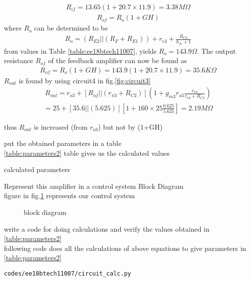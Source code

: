 \begin{enumerate}[label=\thesubsection.\arabic*.,ref=\thesubsection.\theenumi]
{\begin{align}
    R_{if}=13.65(1+20.7\times11.9)=3.38M\Omega
\end{align}
\begin{align}
    R_{of}=R_o(1+GH)
\end{align}
where $R_o$ can be determined to be 
 \begin{align}
    R_o=(R_{E2}||(R_F+R_{E1}))+r_{e3}+\frac{R_{C2}}{h_{fe}+1}
\end{align}
from values in Table \ref{table:ee18btech11007}, yields $R_o = 143.9 \Omega$. The output resistance $R_{of}$ of the feedback amplifier can now be found as
\begin{align}
    R_{of}=R_o(1+GH)=143.9(1+20.7\times11.9)=35.6K\Omega
\end{align}
$R_{out}$ is found by using circuit4 in fig.\ref{fig:circuit3}
\begin{align}
    R_{out}=r_{o3}+[R_{of}||(r_{\pi3}+R_{C2})](1+g_{m3}r_{o3}\frac{r_{\pi3}}{r_{\pi3}+R_{C2}})
\end{align}
\begin{align}
=25+[35.6||(5.625)][1+160\times25\frac{0.625}{5.625}]=2.19M\Omega \end{align}

thus $R_{out}$ is increased (from $r_{o3}$) but not by (1+GH)
\item put the obtained parameters in a table
\\
\solution \ref{table:parameters2} table gives us the calculated values
\begin{table}[!ht]
\centering

\caption{calculated parameters}
\label{table:parameters2}
\end{table}
\item Represent this amplifier in  a control system Block Diagram
\\
\solution figure in  fig.\ref{fig:block_diagram} represents our control system
\begin{figure}[!ht]
	\begin{center}
		
		\resizebox{\columnwidth}{!}{}
	\end{center}
\caption{block diagram}
\label{fig:block_diagram}
\end{figure}
\item write a code for doing calculations and verify the values obtained in \ref{table:parameters2} 
\\
\solution 
following code does all the calculations of above equations to give parameters in
\ref{table:parameters2} 
\begin{lstlisting}
codes/ee18btech11007/circuit_calc.py
\end{lstlisting}
}%



\end{enumerate}
